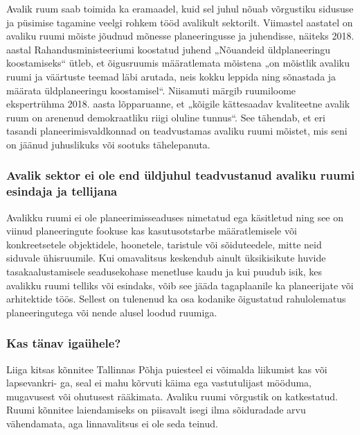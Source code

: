 \documentclass[estonian,]{article}
\begin{document}
Avalik ruum saab toimida ka eramaadel, kuid sel juhul nõuab võrgustiku sidususe ja püsimise tagamine veelgi rohkem tööd avalikult sektorilt. Viimastel aastatel on avaliku ruumi mõiste jõudnud mõnesse planeeringusse ja juhendisse, näiteks 2018. aastal Rahandusministeeriumi koostatud juhend „Nõuandeid üldplaneeringu koostamiseks`` ütleb, et õigusruumis määratlemata mõistena „on mõistlik avaliku ruumi ja väärtuste teemad läbi arutada, neis kokku leppida ning sõnastada ja määrata üldplaneeringu koostamisel``. Niisamuti märgib ruumiloome ekspertrühma 2018. aasta lõpparuanne, et „kõigile kättesaadav kvaliteetne avalik ruum on arenenud demokraatliku riigi oluline tunnus``. See tähendab, et eri tasandi planeerimisvaldkonnad on teadvustamas avaliku ruumi mõistet, mis seni on jäänud juhuslikuks või sootuks tähelepanuta.

\hypertarget{avalik-sektor-ei-ole-end-uxfcldjuhul-teadvustanud-avaliku-ruumi-esindaja-ja-tellijana}{%
\subsubsection*{Avalik sektor ei ole end üldjuhul teadvustanud avaliku ruumi esindaja ja tellijana}\label{avalik-sektor-ei-ole-end-uxfcldjuhul-teadvustanud-avaliku-ruumi-esindaja-ja-tellijana}}

Avalikku ruumi ei ole planeerimisseaduses nimetatud ega käsitletud ning see on viinud planeeringute fookuse kas kasutusotstarbe määratlemisele või konkreetsetele objektidele, hoonetele, taristule või sõiduteedele, mitte neid siduvale ühisruumile. Kui omavalitsus keskendub ainult üksikisikute huvide tasakaalustamisele seadusekohase menetluse kaudu ja kui puudub isik, kes avalikku ruumi telliks või esindaks, võib see jääda tagaplaanile ka planeerijate või arhitektide töös. Sellest on tulenenud ka osa kodanike õigustatud rahulolematus planeeringutega või nende alusel loodud ruumiga.

\hypertarget{kas-tuxe4nav-igauxfchele}{%
\subsubsection{Kas tänav igaühele?}\label{kas-tuxe4nav-igauxfchele}}

Liiga kitsas kõnnitee Tallinnas Põhja puiesteel ei võimalda liikumist kas või lapsevankri- ga, seal ei mahu kõrvuti käima ega vastutulijast mööduma, mugavusest või ohutusest rääkimata. Avaliku ruumi võrgustik on katkestatud. Ruumi kõnnitee laiendamiseks on piisavalt isegi ilma sõiduradade arvu vähendamata, aga linnavalitsus ei ole seda teinud.
\end{document}
